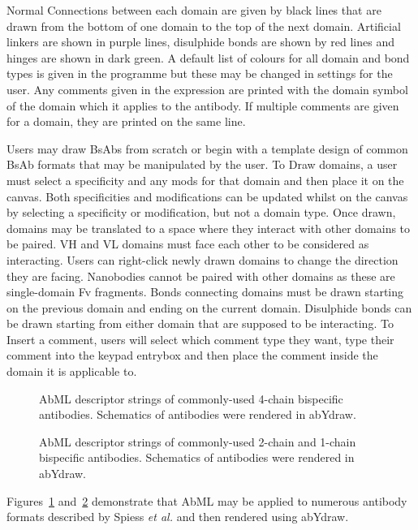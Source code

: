 \documentclass{article}
\newcommand{\etal}{\emph{et al.}}
\let\shortcite\cite
\begin{document}
Normal Connections between each domain are given by black lines that
are drawn from the bottom of one domain to the top of the next
domain. Artificial linkers are shown in purple lines, disulphide bonds
are shown by red lines and hinges are shown in dark green. A default
list of colours for all domain and bond types is given in the
programme but these may be changed in settings for the user. Any
comments given in the expression are printed with the domain symbol of
the domain which it applies to the antibody. If multiple comments are
given for a domain, they are printed on the same line. 

Users may draw BsAbs from scratch or begin with a template design of
common BsAb formats that may be manipulated by the user. To Draw
domains, a user must select a specificity and any mods for that domain
and then place it on the canvas. Both specificities and modifications
can be updated whilst on the canvas by selecting a specificity or
modification, but not a domain type. Once drawn, domains may be
translated to a space where they interact with other domains to be
paired. VH and VL domains must face each other to be considered as
interacting. Users can right-click newly drawn domains to change the
direction they are facing. Nanobodies cannot be paired with other
domains as these are single-domain Fv fragments. Bonds connecting
domains must be drawn starting on the previous domain and ending on
the current domain. Disulphide bonds can be drawn starting from either
domain that are supposed to be interacting. To Insert a comment, users
will select which comment type they want, type their comment into the
keypad entrybox and then place the comment inside the domain it is
applicable to.  

\begin{figure}
\caption{\label{fig:2} AbML descriptor strings of commonly-used
4-chain bispecific antibodies. Schematics of antibodies were rendered
in abYdraw.} 
\end{figure}

\begin{figure}
\caption{\label{fig:3} AbML descriptor strings of commonly-used
2-chain and 1-chain bispecific antibodies. Schematics of antibodies
were rendered in abYdraw.} 
\end{figure}

Figures~\ref{fig:2} and~\ref{fig:3} demonstrate that AbML may be
applied to numerous antibody formats described by Spiess \etal
\shortcite{spiess:2015} and then rendered using abYdraw.
\end{document}
